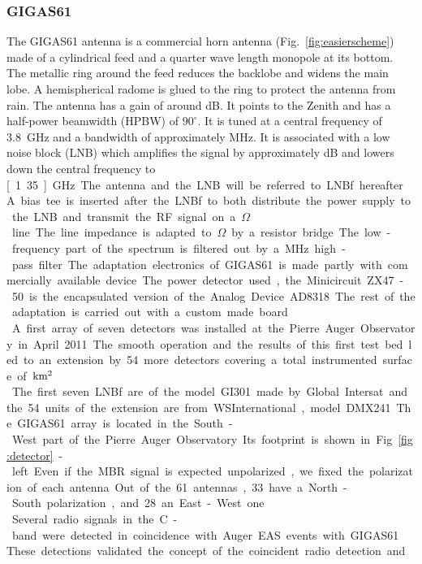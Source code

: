 \subsubsection*{GIGAS61}
The    \mbox{GIGAS61}    antenna     is    a    commercial    horn    antenna
(Fig.~\ref{fig:easierscheme}) made of a cylindrical feed and a quarter
wave length monopole at its  bottom. The metallic ring around the feed
reduces the backlobe and widens the main lobe.  A hemispherical radome
is glued  to the ring to  protect the antenna from  rain.  The antenna
has a gain  of around \unit[9]{dB}. It points to the  Zenith and has a
half-power beamwidth (HPBW)  of $90^\circ$.  It is tuned  at a central
frequency of 3.8~GHz and a bandwidth of approximately \unit[500]{MHz}.
It  is associated with  a low  noise block  (LNB) which  amplifies the
signal  by approximately  \unit[60]{dB}  and lowers  down the  central
frequency  to  \unit[1.35]{GHz}.  The  antenna  and  the  LNB will  be
referred to LNBf  hereafter. A bias tee is inserted  after the LNBf to
both distribute the power supply to the LNB and transmit the RF signal
on  a \unit[75]{$\Omega$}  line.   The line  impedance  is adapted  to
\unit[50]{$\Omega$} by  a resistor bridge.  The  low-frequency part of
the spectrum  is filtered out  by a \unit[900]{MHz}  high-pass filter.
The adaptation electronics of \mbox{GIGAS61} is made partly with commercially
available device.  The power detector used, the Minicircuit ZX47-50 is
the encapsulated version of the  Analog Device AD8318. The rest of the
adaptation is carried out with  a custom made board.\\A first array of
seven detectors was installed at the Pierre Auger Observatory in April
2011.  The smooth operation and the results of this first test bed led
to an  extension by  54 more detectors  covering a  total instrumented
surface of  \unit[93]{$\rm km^2$}.   The first seven  LNBf are  of the
model GI301 made by Global Intersat  and the 54 units of the extension
are from WSInternational, model  DMX241.  The \mbox{GIGAS61} array is located
in the South-West part of the Pierre Auger Observatory.  Its footprint
is shown  in Fig.~\ref{fig:detector}-left.  Even if the  MBR signal is
expected unpolarized,  we fixed the polarization of  each antenna. Out
of  the 61 antennas,  33 have  a North-South  polarization, and  28 an
East-West one.\\ Several radio signals  in the C-band were detected in
coincidence  with Auger  EAS events  with  \mbox{GIGAS61}\cite{amber}.  These
detections validated the concept of the coincident radio detection and
